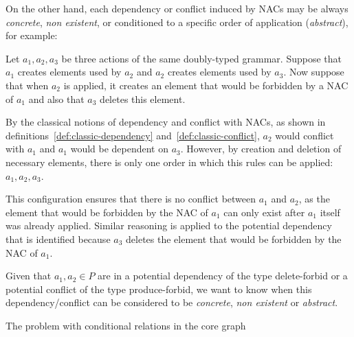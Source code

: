 On the other hand, each dependency or conflict induced by NACs may be always \emph{concrete}, \emph{non existent}, or conditioned to a specific order of application (\emph{abstract}), for example: 

Let $a_1, a_2, a_3$ be three actions of the same doubly-typed grammar. Suppose that $a_1$ creates elements used by $a_2$ and $a_2$ creates elements used by $a_3$. 
Now suppose that when $a_2$ is applied, it creates an element that would be forbidden by a NAC of $a_1$ and also that $a_3$ deletes this element. 

By the classical notions of dependency and conflict with NACs, as shown in definitions~\ref{def:classic-dependency} and~\ref{def:classic-conflict}, $a_2$ would conflict with $a_1$ and $a_1$ would be dependent on $a_3$. However, by creation and deletion of necessary elements, there is only one order in which this rules can be applied: $a_1,a_2,a_3$.

This configuration ensures that there is no conflict between $a_1$ and $a_2$, as the element that would be forbidden by the NAC of $a_1$ can only exist after $a_1$ itself was already applied. Similar reasoning is applied to the potential dependency that is identified because $a_3$ deletes the element that would be forbidden by the NAC of $a_1$.

Given that $a_1, a_2 \in P$ are in a potential dependency of the type delete-forbid or a potential conflict of the type produce-forbid, we want to know when this dependency/conflict can be considered to be \emph{concrete}, \emph{non existent} or \emph{abstract}.

The problem with conditional relations in the core graph

